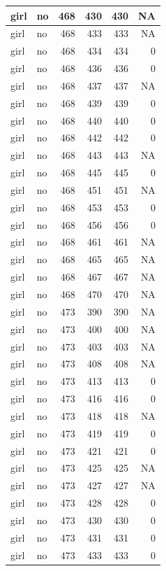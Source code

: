 \documentclass[man]{apa6}
\begin{document}
\begin{tabular}{l|l|r|r|r|r}
\hline
girl & no & 468 & 430 & 430 & NA\\
\hline
girl & no & 468 & 433 & 433 & NA\\
\hline
girl & no & 468 & 434 & 434 & 0\\
\hline
girl & no & 468 & 436 & 436 & 0\\
\hline
girl & no & 468 & 437 & 437 & NA\\
\hline
girl & no & 468 & 439 & 439 & 0\\
\hline
girl & no & 468 & 440 & 440 & 0\\
\hline
girl & no & 468 & 442 & 442 & 0\\
\hline
girl & no & 468 & 443 & 443 & NA\\
\hline
girl & no & 468 & 445 & 445 & 0\\
\hline
girl & no & 468 & 451 & 451 & NA\\
\hline
girl & no & 468 & 453 & 453 & 0\\
\hline
girl & no & 468 & 456 & 456 & 0\\
\hline
girl & no & 468 & 461 & 461 & NA\\
\hline
girl & no & 468 & 465 & 465 & NA\\
\hline
girl & no & 468 & 467 & 467 & NA\\
\hline
girl & no & 468 & 470 & 470 & NA\\
\hline
girl & no & 473 & 390 & 390 & NA\\
\hline
girl & no & 473 & 400 & 400 & NA\\
\hline
girl & no & 473 & 403 & 403 & NA\\
\hline
girl & no & 473 & 408 & 408 & NA\\
\hline
girl & no & 473 & 413 & 413 & 0\\
\hline
girl & no & 473 & 416 & 416 & 0\\
\hline
girl & no & 473 & 418 & 418 & NA\\
\hline
girl & no & 473 & 419 & 419 & 0\\
\hline
girl & no & 473 & 421 & 421 & 0\\
\hline
girl & no & 473 & 425 & 425 & NA\\
\hline
girl & no & 473 & 427 & 427 & NA\\
\hline
girl & no & 473 & 428 & 428 & 0\\
\hline
girl & no & 473 & 430 & 430 & 0\\
\hline
girl & no & 473 & 431 & 431 & 0\\
\hline
girl & no & 473 & 433 & 433 & 0\\

\end{tabular}
\end{document}
